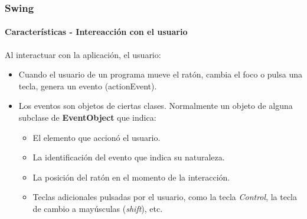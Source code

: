 \documentclass{beamer}
\begin{document}
	\begin{frame}
		\frametitle{Swing}
		\framesubtitle{Caracter\'isticas - Intereacci\'on con el usuario}

        Al interactuar con la aplicaci\'on, el usuario:

	    \begin{itemize}
		    \item[] Cuando el usuario de un programa mueve el rat\'on, cambia el foco o pulsa una tecla, genera un evento (actionEvent).
		    \item[] Los eventos son objetos de ciertas clases. Normalmente un objeto de alguna subclase de \textbf{EventObject} que indica:
		    \begin{itemize}
        		    \item[\checkmark] El elemento que accion\'o el usuario.
        		    \item[\checkmark] La identificaci\'on del evento que indica su naturaleza.
        		    \item[\checkmark] La posici\'on del rat\'on en el momento de la interacci\'on.
        		    \item[\checkmark] Teclas adicionales pulsadas por el usuario, como la tecla \emph{Control}, la tecla de cambio a may\'usculas (\emph{shift}), etc.
	    	    \end{itemize}
        \end{itemize}
	\end{frame}	
\end{document}
